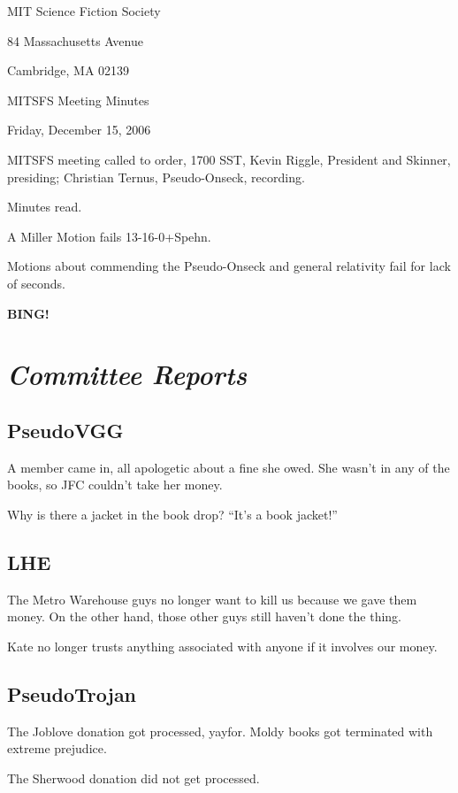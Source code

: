 \documentclass[10pt]{article}
\newcommand{\bing}{{\bf BING!} }
\newcommand{\goto}[1]{\bing \vskip 12pt \section*{{\em{#1}}}}
\begin{document}
\begin{center}

MIT Science Fiction Society

84 Massachusetts Avenue

Cambridge, MA 02139

\vspace{12pt}

MITSFS Meeting Minutes

Friday, December 15, 2006

\end{center}

\vspace{18pt}

\setlength{\parskip}{6pt}

\noindent
MITSFS meeting called to order, 1700 SST,
Kevin Riggle, President and Skinner, presiding; Christian Ternus, Pseudo-Onseck, recording.

Minutes read.

A Miller Motion fails 13-16-0+Spehn.

Motions about commending the Pseudo-Onseck and general relativity fail for lack of seconds.

\goto{Committee Reports}

\subsection*{PseudoVGG}
A member came in, all apologetic about a fine she owed. She wasn't in any of the books, so JFC couldn't take her money.

Why is there a jacket in the book drop? ``It's a book jacket!''

\subsection*{LHE}
The Metro Warehouse guys no longer want to kill us because we gave them money. On the other hand, those other guys still haven't done the thing.

Kate no longer trusts anything associated with anyone if it involves our money.

\subsection*{PseudoTrojan}
The Joblove donation got processed, yayfor. Moldy books got terminated with extreme prejudice.

The Sherwood donation did not get processed.
\end{document}
